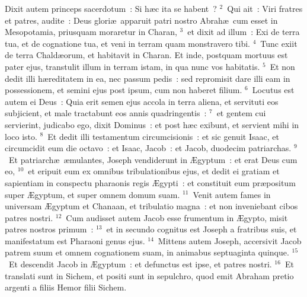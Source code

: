 \lettrine[lines=3,image=true,loversize=0.05,lraise=-0.03]{D}{}ixit autem princeps sacerdotum~: Si h\ae c ita se habent~?
${}^{2}$~Qui ait~: Viri fratres et patres, audite~: Deus glori\ae\ apparuit patri nostro Abrah\ae\ cum esset in Mesopotamia, priusquam moraretur in Charan,
${}^{3}$~et dixit ad illum~: Exi de terra tua, et de cognatione tua, et veni in terram quam monstravero tibi.
${}^{4}$~Tunc exiit de terra Chald\ae orum, et habitavit in Charan. Et inde, postquam mortuus est pater ejus, transtulit illum in terram istam, in qua nunc vos habitatis.
${}^{5}$~Et non dedit illi h\ae reditatem in ea, nec passum pedis~: sed repromisit dare illi eam in possessionem, et semini ejus post ipsum, cum non haberet filium.
${}^{6}$~Locutus est autem ei Deus~: Quia erit semen ejus accola in terra aliena, et servituti eos subjicient, et male tractabunt eos annis quadringentis~:
${}^{7}$~et gentem cui servierint, judicabo ego, dixit Dominus~: et post h\ae c exibunt, et servient mihi in loco isto.
${}^{8}$~Et dedit illi testamentum circumcisionis~: et sic genuit Isaac, et circumcidit eum die octavo~: et Isaac, Jacob~: et Jacob, duodecim patriarchas.
${}^{9}$~Et patriarch\ae\ \ae mulantes, Joseph vendiderunt in \AE gyptum~: et erat Deus cum eo,
${}^{10}$~et eripuit eum ex omnibus tribulationibus ejus, et dedit ei gratiam et sapientiam in conspectu pharaonis regis \AE gypti~: et constituit eum pr\ae positum super \AE gyptum, et super omnem domum suam.
${}^{11}$~Venit autem fames in universam \AE gyptum et Chanaan, et tribulatio magna~: et non inveniebant cibos patres nostri.
${}^{12}$~Cum audisset autem Jacob esse frumentum in \AE gypto, misit patres nostros primum~:
${}^{13}$~et in secundo cognitus est Joseph a fratribus suis, et manifestatum est Pharaoni genus ejus.
${}^{14}$~Mittens autem Joseph, accersivit Jacob patrem suum et omnem cognationem suam, in animabus septuaginta quinque.
${}^{15}$~Et descendit Jacob in \AE gyptum~: et defunctus est ipse, et patres nostri.
${}^{16}$~Et translati sunt in Sichem, et positi sunt in sepulchro, quod emit Abraham pretio argenti a filiis Hemor filii Sichem.


